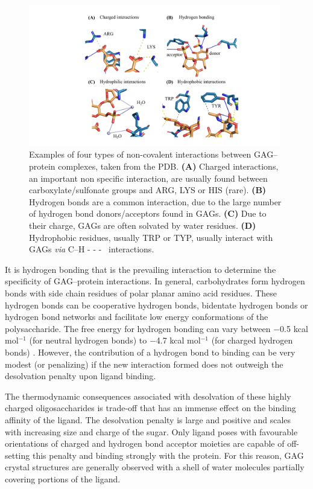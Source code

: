 \documentclass[journal=jctcce,manuscript=article]{achemso}
\begin{document}
{\begin{figure}[bl!]
    \centering
    \includegraphics[width=11cm]{interactions.pdf}
    \caption{Examples of four types of non-covalent interactions between GAG--protein complexes, taken from the PDB. \textbf{(A)} Charged interactions, an important non specific interaction, are usually found between carboxylate/sulfonate groups and ARG, LYS or HIS (rare). \textbf{(B)} Hydrogen bonds are a common interaction, due to the large number of hydrogen bond donors/acceptors found in GAGs. \textbf{(C)} Due to their charge, GAGs are often solvated by water residues. \textbf{(D)} Hydrophobic residues, usually TRP or TYP, usually interact with GAGs \textit{via} C--H - - - \textpi~interactions.}
    \label{fig:interactions}
\end{figure}


It is hydrogen bonding that is the prevailing interaction to determine the specificity of \ac{GAG}--protein interactions. In general, carbohydrates form hydrogen bonds with side chain residues of polar planar amino acid residues. \cite{Malik2007SequenceNetwork}
These hydrogen bonds can be cooperative hydrogen bonds, bidentate hydrogen bonds or hydrogen bond networks and facilitate low energy conformations of the polysaccharide.\cite{Quiocho1989Protein-carbohydrateFeatures}  
The free energy for hydrogen bonding can vary between −0.5 kcal mol$^{-1}$ (for neutral hydrogen bonds) to −4.7 kcal mol$^{-1}$ (for charged hydrogen bonds) \cite{Davis1997HydrogenHypothesis}. However, the contribution of a hydrogen bond to binding can be very modest (or penalizing) if the new interaction formed does not outweigh the desolvation penalty upon ligand binding. \cite{H.Williams1998AspectsInteractions}

The thermodynamic consequences associated with desolvation of these highly charged oligosaccharides is trade-off that has an immense effect on the binding affinity of the ligand.\cite{Gandhi2009FreeInteractions, Samsonov2014FlexibilitySystems}
The desolvation penalty is large and positive and scales with increasing size and charge of the sugar.\cite{Gandhi2009FreeInteractions, Samsonov2014FlexibilitySystems} 
Only ligand poses with favourable orientations of charged and hydrogen bond acceptor moieties are capable of off-setting this penalty and binding strongly with the protein. \cite{Bryce2001Carbohydrate-ProteinA}
For this reason, \ac{GAG} crystal structures are generally observed with a shell of water molecules partially covering portions of the ligand. \cite{Gandhi2009FreeInteractions, Capila2002Heparin-proteinInteractions.}

}
\end{document}
